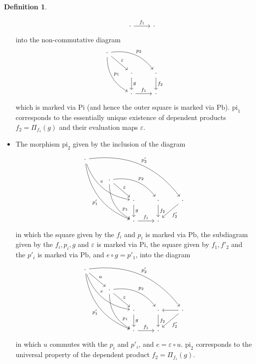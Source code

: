 \documentclass[a4paper]{article}
\theoremstyle{remark}
\theoremstyle{definition}
\newtheorem{definition}[theorem]{Definition}
\begin{document}
\begin{definition}
\begin{itemize}
\begin{equation}
\begin{tikzcd}
          & \cdot \arrow[r, "f_1"] & \cdot
        \end{tikzcd}
      \end{equation}
      into the non-commutative diagram
      \begin{equation}
        \begin{tikzcd}
          \cdot \arrow[ddr, bend right, "p_1"] \arrow[drr, bend left, "p_2"] \arrow[dr, "\varepsilon"] \\
          & \cdot \arrow[d, "g"] & \cdot \arrow[d, "f_2"] \\
          & \cdot \arrow[r, "f_1"] & \cdot
        \end{tikzcd}
      \end{equation}
      which is marked via $\mathrm{Pi}$ (and hence the outer square is marked via $\mathrm{Pb}$).
      $\mathrm{pi}_1$ corresponds to the essentially unique existence of dependent products $f_2 = \Pi_{f_1}(g)$ and their evaluation maps $\varepsilon$.
    \item
      The morphism $\mathrm{pi}_2$ given by the inclusion of the diagram
      \begin{equation}
        \begin{tikzcd}
          \cdot \arrow[dddrr, bend right, "p'_1"'] \arrow[ddrrrr, bend left, "p'_2"] \arrow[ddrr, bend right, "e", pos=0.4] & \\
          & \cdot \arrow[ddr, bend right, "p_1", near end] \arrow[drr, bend left, "p_2"] \arrow[dr, "\varepsilon"] \\
          & & \cdot \arrow[d, "g"] & \cdot \arrow[d, "f_2"] & \cdot \arrow[dl, "f'_2"] \\
          & & \cdot \arrow[r, "f_1"] & \cdot
        \end{tikzcd}
      \end{equation}
      in which the square given by the $f_i$ and $p_i$ is marked via $\mathrm{Pb}$, the subdiagram given by the $f_i, p_i, g$ and $\varepsilon$ is marked via $\mathrm{Pi}$, the square given by $f_1, f'_2$ and the $p'_i$ is marked via $\mathrm{Pb}$, and $e \circ g = p'_1$, into the diagram
      \begin{equation}
        \begin{tikzcd}
          \cdot \arrow[dr, "u"] \arrow[dddrr, bend right, "p'_1"'] \arrow[ddrrrr, bend left, "p'_2"] \arrow[ddrr, bend right, "e", pos=0.4] & \\
          & \cdot \arrow[ddr, bend right, "p_1" near end] \arrow[drr, bend left, "p_2"] \arrow[dr, "\varepsilon"] \\
          & & \cdot \arrow[d, "g"] & \cdot \arrow[d, "f_2"] & \cdot \arrow[dl, "f'_2"] \arrow[l] \\
          & & \cdot \arrow[r, "f_1"] & \cdot
        \end{tikzcd}
      \end{equation}
      in which $u$ commutes with the $p_i$ and $p'_i$, and $e = \varepsilon \circ u$.
      $\mathrm{pi}_2$ corresponds to the universal property of the dependent product $f_2 = \Pi_{f_1}(g)$.
  \end{itemize}
\end{definition}
\end{document}
